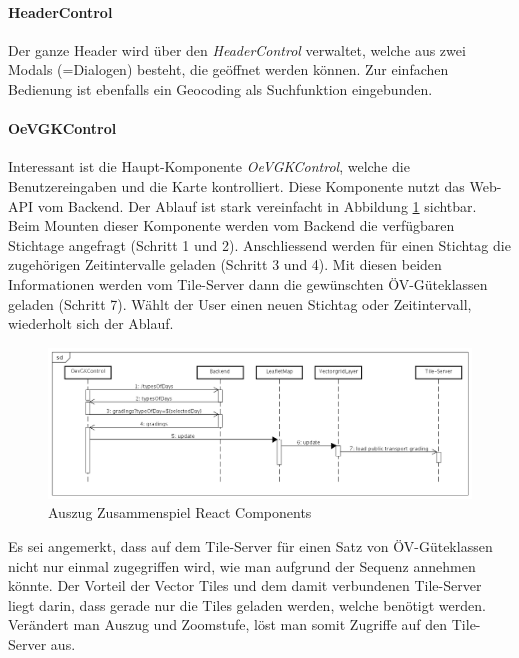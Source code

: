 \paragraph{HeaderControl}
Der ganze Header wird über den \emph{HeaderControl} verwaltet, welche aus zwei Modals (=Dialogen) besteht, die geöffnet werden können.
Zur einfachen Bedienung ist ebenfalls ein \gls{Geocoding} als Suchfunktion eingebunden.

\paragraph{OeVGKControl}
Interessant ist die Haupt-Komponente \emph{OeVGKControl}, welche die Benutzereingaben und die Karte kontrolliert.
Diese Komponente nutzt das Web-\acs{API} vom Backend.
Der Ablauf ist stark vereinfacht in Abbildung \ref{fig:Web-App_Sequence} sichtbar.
Beim Mounten dieser Komponente werden vom Backend die verfügbaren Stichtage angefragt (Schritt 1 und 2).
Anschliessend werden für einen Stichtag die zugehörigen Zeitintervalle geladen (Schritt 3 und 4).
Mit diesen beiden Informationen werden vom Tile-Server dann die gewünschten \acs{ÖV}-Güteklassen geladen (Schritt 7).
Wählt der User einen neuen Stichtag oder Zeitintervall, wiederholt sich der Ablauf.

\begin{figure}[ht]
    \centering
    \includegraphics[width=1.0\linewidth]{projectdoc/img/Web-App_Sequence.png}
    \caption[Auszug Zusammenspiel React Components]{Auszug Zusammenspiel React Components}
    \label{fig:Web-App_Sequence}
\end{figure}

Es sei angemerkt, dass auf dem Tile-Server für einen Satz von \acs{ÖV}-Güteklassen nicht nur einmal zugegriffen wird, wie man aufgrund der Sequenz annehmen könnte.
Der Vorteil der Vector Tiles und dem damit verbundenen Tile-Server liegt darin, dass gerade nur die Tiles geladen werden, welche benötigt werden. Verändert man Auszug und Zoomstufe, löst man somit Zugriffe auf den Tile-Server aus.

